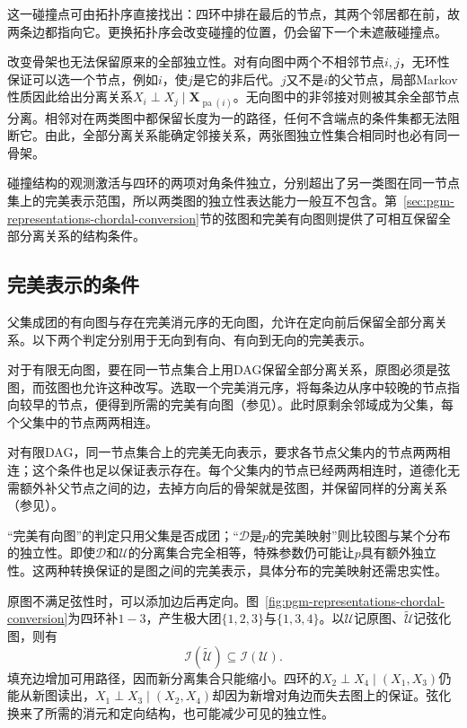 这一碰撞点可由拓扑序直接找出：四环中排在最后的节点，其两个邻居都在前，故两条边都指向它。更换拓扑序会改变碰撞的位置，仍会留下一个未遮蔽碰撞点。

改变骨架也无法保留原来的全部独立性。对有向图中两个不相邻节点$i,j$，无环性保证可以选一个节点，例如$i$，使$j$是它的非后代。$j$又不是$i$的父节点，局部Markov性质因此给出分离关系$X_i\perp X_j\mid\bm{X}_{\operatorname{pa}(i)}$。无向图中的非邻接对则被其余全部节点分离。相邻对在两类图中都保留长度为一的路径，任何不含端点的条件集都无法阻断它。由此，全部分离关系能确定邻接关系，两张图独立性集合相同时也必有同一骨架。

碰撞结构的观测激活与四环的两项对角条件独立，分别超出了另一类图在同一节点集上的完美表示范围，所以两类图的独立性表达能力一般互不包含。第~\ref{sec:pgm-representations-chordal-conversion}节的弦图和完美有向图则提供了可相互保留全部分离关系的结构条件。

\subsection{完美表示的条件}
\label{sec:pgm-representations-perfect-dags}

父集成团的有向图与存在完美消元序的无向图，允许在定向前后保留全部分离关系。以下两个判定分别用于无向到有向、有向到无向的完美表示。

对于有限无向图，要在同一节点集合上用DAG保留全部分离关系，原图必须是弦图，而弦图也允许这种改写。选取一个完美消元序，将每条边从序中较晚的节点指向较早的节点，便得到所需的完美有向图（参见）。此时原剩余邻域成为父集，每个父集中的节点两两相连。


对有限DAG，同一节点集合上的完美无向表示，要求各节点父集内的节点两两相连；这个条件也足以保证表示存在。每个父集内的节点已经两两相连时，道德化无需额外补父节点之间的边，去掉方向后的骨架就是弦图，并保留同样的分离关系（参见）。

“完美有向图”的判定只用父集是否成团；“$\mathcal{D}$是$p$的完美映射”则比较图与某个分布的独立性。即使$\mathcal{D}$和$\mathcal{U}$的分离集合完全相等，特殊参数仍可能让$p$具有额外独立性。这两种转换保证的是图之间的完美表示，具体分布的完美映射还需忠实性。

原图不满足弦性时，可以添加边后再定向。图~\ref{fig:pgm-representations-chordal-conversion}为四环补$1-3$，产生极大团$\{1,2,3\}$与$\{1,3,4\}$。以$\mathcal{U}$记原图、$\widetilde{\mathcal{U}}$记弦化图，则有
\[
  \mathcal{I}(\widetilde{\mathcal{U}})
  \subseteq \mathcal{I}(\mathcal{U}).
\]
填充边增加可用路径，因而新分离集合只能缩小。四环的$X_2\perp X_4\mid(X_1,X_3)$仍能从新图读出，$X_1\perp X_3\mid(X_2,X_4)$却因为新增对角边而失去图上的保证。弦化换来了所需的消元和定向结构，也可能减少可见的独立性。

